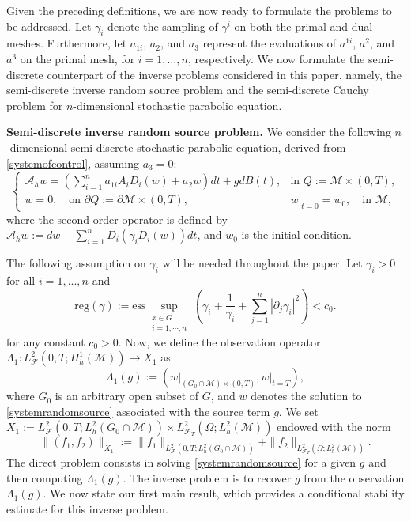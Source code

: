 \documentclass[11pt,oneside,leqno]{amsart}
\numberwithin{equation}{section}
\numberwithin{equation}{section}
\begin{document}
Given the preceding definitions, we are now ready to formulate the problems to be addressed. Let $\gamma_i$ denote the sampling of $\gamma^{i}$ on both the primal and dual meshes. Furthermore, { let $a_{1i}$, $a_2$, and $a_3$ represent the evaluations of $a^{1i}$, $a^2$, and $a^3$} on the primal mesh, for $i = 1, \ldots, n$, respectively. We now formulate the semi-discrete counterpart of the inverse problems considered in this paper, namely, the semi-discrete inverse random source problem and the semi-discrete Cauchy problem for $n$-dimensional stochastic parabolic equation. 


\textbf{Semi-discrete inverse random source problem.} We consider the following $n$-dimensional semi-discrete stochastic parabolic equation, derived from \eqref{systemofcontrol}, assuming $a_3 = 0$:
\begin{equation}\label{systemrandomsource}
    \begin{cases}
    \mathcal{A}_{h}w=\left(\sum_{i=1}^n a_{1i}A_iD_i(w)+a_2w\right)dt+gdB(t),     &\text{in } Q:= \mathcal{M}\times (0,T),  \\
    w=0,\quad\text{on } { \partial Q:=\partial \mathcal{M}\times (0,T)},&\left.w\right|_{t=0}=w_0, \quad\text{in } \mathcal{M},
    \end{cases}
\end{equation}
where the second-order operator is defined by $\mathcal{A}_h w := dw - \sum_{i=1}^n D_i(\gamma_i D_i(w))dt$, and $w_0$ is the initial condition. 

The following assumption on $\gamma_i$ will be needed throughout the paper. Let $\gamma_i>0$ for all $i=1,...,n$ and 
$$
 \mbox{reg}(\gamma):= \text{ess}\sup_{\substack{x\in G \\ i=1,\cdots,n}}\left(\gamma_i+\frac{1}{\gamma_i}+{ \sum_{j=1}^{n}|\partial_{j}\gamma_i|^2}\right)<c_0.
$$
for any constant $c_0> 0$.
{ 
Now, we define the observation operator $\Lambda_1: L^2_{\mathcal{F}}(0,T;H_h^1(\mathcal{M})) \longrightarrow X_1
$
as
$$
\Lambda_1(g) := \left(\left.w\right|_{(G_0\cap\mathcal{M})\times(0,T)}, \left.w\right|_{t=T}\right),
$$
where $G_0$ is an arbitrary open subset of $G$, and $w$ denotes the solution to \eqref{systemrandomsource} associated with the source term $g$.} We set $X_1:= L^2_{\mathcal{F}}(0,T;L_h^2(G_0\cap\mathcal{M}))\times L^2_{\mathcal{F}_T}(\Omega;L^2_{h}(\mathcal{M}))$ endowed with the norm
$$
\|(f_1,f_2)\|_{X_1}:= \|f_1\|_{L^2_{\mathcal{F}}(0,T;L_h^2(G_0\cap\mathcal{M}))}+\|f_2\|_{L^2_{\mathcal{F}_T}(\Omega;L^2_{h}(\mathcal{M}))}.
$$
The direct problem consists in solving \eqref{systemrandomsource} for a given $g$ and then computing $\Lambda_{1}(g)$. The inverse problem is to recover $g$ from the observation $\Lambda_1(g)$. We now state our first main result, which provides a conditional stability estimate for this inverse problem.
\end{document}

